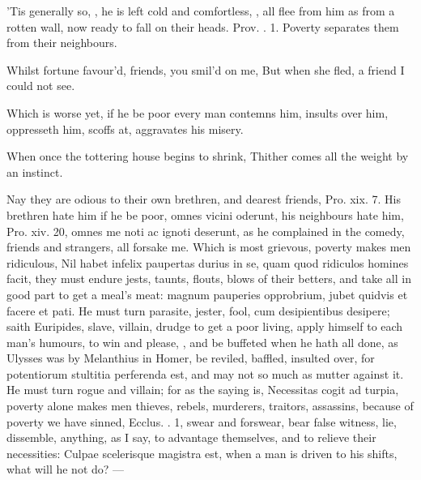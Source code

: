 {'Tis generally so, , he is left
cold and comfortless, , all flee from
him as from a rotten wall, now ready to fall on their heads. Prov. .
1. Poverty separates them from their neighbours.

Whilst fortune favour'd, friends, you smil'd on me,
But when she fled, a friend I could not see.

Which is worse yet, if he be poor every man contemns him, insults
over him, oppresseth him, scoffs at, aggravates his misery.

When once the tottering house begins to shrink,
Thither comes all the weight by an instinct.

Nay they are odious to their own brethren, and dearest friends, Pro.
xix. 7. His brethren hate him if he be poor, omnes vicini
oderunt, his neighbours hate him, Pro. xiv. 20, omnes me noti ac
ignoti deserunt, as he complained in the comedy, friends and strangers,
all forsake me. Which is most grievous, poverty makes men ridiculous,
Nil habet infelix paupertas durius in se, quam quod ridiculos homines
facit, they must endure jests, taunts, flouts, blows of their
betters, and take all in good part to get a meal's meat: magnum
pauperies opprobrium, jubet quidvis et facere et pati. He must turn
parasite, jester, fool, cum desipientibus desipere; saith
Euripides, slave, villain, drudge to get a poor living, apply
himself to each man's humours, to win and please, \etc{}, and be buffeted
when he hath all done, as Ulysses was by Melanthius in Homer, be
reviled, baffled, insulted over, for potentiorum stultitia
perferenda est, and may not so much as mutter against it. He must turn
rogue and villain; for as the saying is, Necessitas cogit ad turpia,
poverty alone makes men thieves, rebels, murderers, traitors,
assassins, because of poverty we have sinned, Ecclus. . 1, swear
and forswear, bear false witness, lie, dissemble, anything, as I say,
to advantage themselves, and to relieve their necessities: 
Culpae scelerisque magistra est, when a man is driven to his shifts,
what will he not do?
---

}
